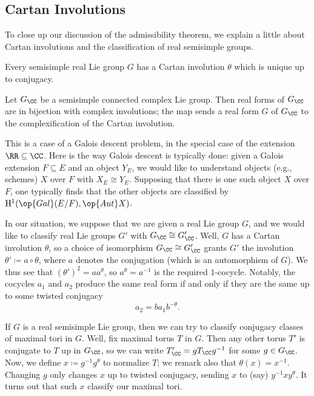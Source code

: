 \documentclass[../notes.tex]{subfiles}
\begin{document}
\subsection{Cartan Involutions}
To close up our discussion of the admissibility theorem, we explain a little about Cartan involutions and the classification of real semisimple groups.
\begin{theorem} \label{thm:cartan-exist}
	Every semisimple real Lie group $G$ has a Cartan involution $\theta$ which is unique up to conjugacy.
\end{theorem}
\begin{theorem} \label{thm:classify-real-forms}
	Let $G_\CC$ be a semisimple connected complex Lie group. Then real forms of $G_\CC$ are in bijection with complex involutions; the map sends a real form $G$ of $G_\CC$ to the complexification of the Cartan involution.
\end{theorem}
This is a case of a Galois descent problem, in the special case of the extension $\RR\subseteq\CC$. Here is the way Galois descent is typically done: given a Galois extension $F\subseteq E$ and an object $Y_E$, we would like to understand objects (e.g., schemes) $X$ over $F$ with $X_E\cong Y_E$. Supposing that there is one such object $X$ over $F$, one typically finds that the other objects are classified by $\mathrm H^1(\op{Gal}(E/F),\op{Aut}X)$.
\begin{example}
	In our situation, we suppose that we are given a real Lie group $G$, and we would like to classify real Lie groups $G'$ with $G_\CC\cong G'_\CC$. Well, $G$ has a Cartan involution $\theta$, so a choice of isomorphism $G_\CC\cong G'_\CC$ grants $G'$ the involution $\theta'\coloneqq a\circ\theta$, where $a$ denotes the conjugation (which is an automorphism of $G$). We thus see that $(\theta')^2=aa^\theta$, so $a^\theta=a^{-1}$ is the required $1$-cocycle. Notably, the cocycles $a_1$ and $a_2$ produce the same real form if and only if they are the same up to some twisted conjugacy
	\[a_2=ba_1b^{-\theta}.\]
\end{example}
\begin{example}
	If $G$ is a real semisimple Lie group, then we can try to classify conjugacy classes of maximal tori in $G$. Well, fix maximal torus $T$ in $G$. Then any other torus $T'$ is conjugate to $T$ up in $G_\CC$, so we can write $T'_\CC=gT_\CC g^{-1}$ for some $g\in G_\CC$. Now, we define $x\coloneqq g^{-1}g^\theta$ to normalize $T$; we remark also that $\theta(x)=x^{-1}$. Changing $g$ only changes $x$ up to twisted conjugacy, sending $x$ to (say) $y^{-1}xy^\theta$. It turns out that such $x$ classify our maximal tori.
\end{example}
\end{document}
